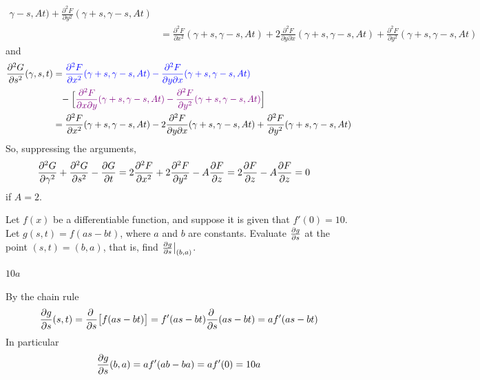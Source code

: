 \begin{solution}
\begin{align*}
{                                                               \gamma-s, At)
  +\frac{\partial^2 F}{\partial y^2}(\gamma + s, \gamma-s,  At)} \\
  &= \frac{\partial^2 F}{\partial x^2}(\gamma + s, \gamma-s, At)
    +2\frac{\partial^2 F}{\partial y\partial x}(\gamma + s, \gamma-s, At)
    +\frac{\partial^2 F}{\partial y^2}(\gamma + s, \gamma-s, At) 
\end{align*}
and
\begin{align*}
\frac{\partial^2G}{\partial s^2}(\gamma,s,t) 
&= \textcolor{blue}{\frac{\partial^2 F}{\partial x^2}(\gamma + s, \gamma-s, At)
   -\frac{\partial^2 F}{\partial y\partial x}(\gamma + s, \gamma-s, At)} \\
                 &\phantom{=}-\Big[ 
  \textcolor{violet}{\frac{\partial^2 F}{\partial x\partial y}(\gamma + s, 
                                                              \gamma-s, At)
         -\frac{\partial^2 F}{\partial y^2}(\gamma + s, \gamma-s, At)}\Big] \\
  &= \frac{\partial^2 F}{\partial x^2}(\gamma + s, \gamma-s, At)
    -2\frac{\partial^2 F}{\partial y\partial x}(\gamma + s, \gamma-s, At)
    +\frac{\partial^2 F}{\partial y^2}(\gamma + s, \gamma-s, At) 
\end{align*}
So, suppressing the arguments,
\begin{align*}
\frac{\partial^2 G}{\partial \gamma^2}
+ \frac{\partial^2 G}{\partial s^2}
-\frac{\partial G}{\partial t}
&=2\frac{\partial^2 F}{\partial x^2} + 2\frac{\partial^2 F}{\partial y^2}
  -A \pdiff{F}{z}
=2\pdiff{F}{z}-A \pdiff{F}{z}
=0
\end{align*}
if $A=2$.
\end{solution}

\begin{question}[M200 2013D] %
Let $f(x)$ be a differentiable function, and suppose it is given that 
$f'(0) = 10$.
Let $g(s,t) = f (as - bt)$, where $a$ and $b$ are constants. Evaluate 
$\pdiff{g}{s}$ at the point $(s,t) = (b,a)$, that is, find 
$\pdiff{g}{s}\big|_{(b,a)}$.
\end{question}

%

\begin{answer}
$10a$
\end{answer}

\begin{solution}
By the chain rule
\begin{align*}
\pdiff{g}{s}(s,t) = \pdiff{}{s}\big[f(as-bt)\big] 
                  =f'(as-bt)\pdiff{}{s}(as-bt)
                  = af'(as-bt)
\end{align*}
In particular
\begin{align*}
\pdiff{g}{s}(b,a) = af'(ab-ba) =af'(0) =10 a 
\end{align*}
\end{solution}


